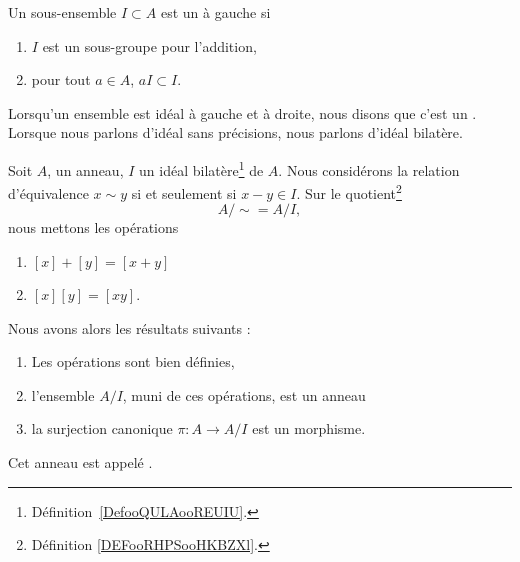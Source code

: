 \begin{definition}  \label{DefooQULAooREUIU}
    Un sous-ensemble \( I\subset A\) est un  à gauche si
    \begin{enumerate}
        \item
            \( I\) est un sous-groupe pour l'addition,
        \item
            pour tout \( a\in A\), \( aI\subset I\).
    \end{enumerate}

    Lorsqu'un ensemble est idéal à gauche et à droite, nous disons que c'est un . Lorsque nous parlons d'idéal sans précisions, nous parlons d'idéal bilatère.
\end{definition}

\begin{propositionDef}      \label{PROPooGXMRooTcUGbi}
    Soit \( A\), un anneau, \( I\) un idéal bilatère\footnote{Définition~\ref{DefooQULAooREUIU}.} de \( A\). Nous considérons la relation d'équivalence \( x\sim y\) si et seulement si \( x-y\in I\). Sur le quotient\footnote{Définition \ref{DEFooRHPSooHKBZXl}.}
    \begin{equation}
        A/\sim=A/I,
    \end{equation}
    nous mettons les opérations
    \begin{enumerate}
        \item
            \( [x]+[y]=[x+y]\)
        \item
            \( [x][y]=[xy]\).
    \end{enumerate}
    Nous avons alors les résultats suivants :
    \begin{enumerate}
        \item       \label{ITEMooEJPEooRKAqmS}
            Les opérations sont bien définies,
        \item       \label{ITEMooYBEGooTlHgNz}
            l'ensemble \( A/I\), muni de ces opérations, est un anneau
        \item       \label{ITEMooLNRLooMkoWXZ}
            la surjection canonique \( \pi\colon A\to A/I\) est un morphisme.
    \end{enumerate}
    Cet anneau est appelé .
\end{propositionDef}

